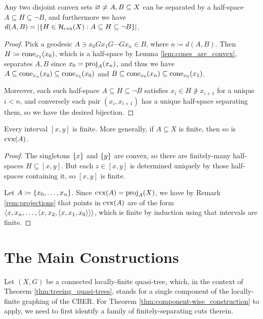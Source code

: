\documentclass[reqno]{amsart}
\begin{document}
    \begin{lemma}\label{lem:half_space_separating_convex}
        Any two disjoint convex sets $\em\neq A,B\subseteq X$ can be separated by a half-space $A\subseteq H\subseteq\lnot B$, and furthermore we have $d(A,B)=|\!\l\{H\in\mc{H}_\mathrm{cvx}(X)\st A\subseteq H\subseteq\lnot B\r\}\!|$.
    \end{lemma}
    \begin{proof}
        Pick a geodesic $A\ni x_0Gx_1G\cdots Gx_n\in B$, where $n\coloneqq d(A,B)$. Then $H\coloneqq\cone_{x_1}(x_0)$, which is a half-space by Lemma \ref{lem:cones_are_convex}, separates $A,B$ since $x_0=\proj_A(x_n)$, and thus we have $A\subseteq\cone_{x_n}(x_0)\subseteq\cone_{x_1}(x_0)$ and $B\subseteq\cone_{x_0}(x_n)\subseteq\cone_{x_0}(x_1)$.

        Moreover, each such half-space $A\subseteq H\subseteq\lnot B$ satisfies $x_i\in H\not\ni x_{i+1}$ for a unique $i<n$, and conversely each pair $(x_i,x_{i+1})$ has a unique half-space separating them, so we have the desired bijection.
    \end{proof}

    \begin{lemma}\label{lem:convex_of_finite_is_finite}
        Every interval $[x,y]$ is finite. More generally, if $A\subseteq X$ is finite, then so is $\cvx(A)$.
    \end{lemma}
    \begin{proof}
        The singletons $\l\{x\r\}$ and $\l\{y\r\}$ are convex, so there are finitely-many half-spaces $H\subseteq[x,y]$. But each $z\in[x,y]$ is determined uniquely by those half-spaces containing it, so $[x,y]$ is finite.

        Let $A\coloneqq\l\{x_0,\dots,x_n\r\}$. Since $\cvx(A)=\proj_A(X)$, we have by Remark \ref{rem:projections} that points in $\cvx(A)$ are of the form $\l\langle x,x_n,\dots,\l\langle x,x_2,\l\langle x,x_1,x_0\r\rangle\r\rangle\r\rangle$, which is finite by induction using that intervals are finite.
    \end{proof}

    \section{The Main Constructions}

    Let $(X,G)$ be a connected locally-finite quasi-tree, which, in the context of Theorem \ref{thm:treeing_quasi-trees}, stands for a single component of the locally-finite graphing of the CBER. For Theorem \ref{thm:component-wise_construction} to apply, we need to first identify a family of finitely-separating cuts therein.
\end{document}
